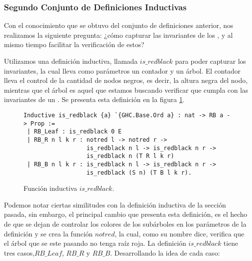 \subsubsection{Segundo Conjunto de Definiciones Inductivas}

Con el conocimiento que se obtuvo del conjunto de definiciones anterior, nos realizamos la
siguiente pregunta: ¿c\'omo capturar las invariantes de los {\arns}, y al mismo tiempo facilitar la
verificaci\'on de estos?

Utilizamos una definición inductiva, llamada \hyperref[inductive_isRedB]{$is\_redblack$} para poder 
capturar los invariantes, la cual lleva como parámetros un contador y un \'arbol. El contador lleva 
el control de la cantidad de nodos negros, es decir, la altura negra del nodo, mientras que el 
\'arbol es aquel que estamos buscando verificar que cumpla con las invariantes de un {\arn}. Se 
presenta esta definici\'on en la figura \ref{inductive_isRedB}.

\begin{figure}[!ht]
\centering
\captionsetup{justification=centering}
\begin{verbatim}
Inductive is_redblack {a} `{GHC.Base.Ord a} : nat -> RB a -> Prop :=
 | RB_Leaf : is_redblack 0 E
 | RB_R n l k r : notred l -> notred r ->
                  is_redblack n l -> is_redblack n r ->
                  is_redblack n (T R l k r)
 | RB_B n l k r : is_redblack n l -> is_redblack n r ->
                  is_redblack (S n) (T B l k r).
\end{verbatim}
\caption{Funci\'on inductiva $is\_redblack$.}
\label{inductive_isRedB}
\end{figure}

Podemos notar ciertas similitudes con la definición inductiva de la secci\'on pasada, sin
embargo, el principal cambio que presenta esta definición, es el hecho de que se dejan de controlar
los colores de los subárboles en los parámetros de la definici\'on y se crea la funci\'on $notred$,
la cual, como su nombre dice, verifica que el \'arbol que se este pasando no tenga raíz roja. La
definici\'on \hyperref[inductive_isRedB]{$is\_redblack$} tiene tres casos,$RB\_Leaf$, $RB\_R$ y 
$RB\_B$. Desarrollando la idea de cada caso:

